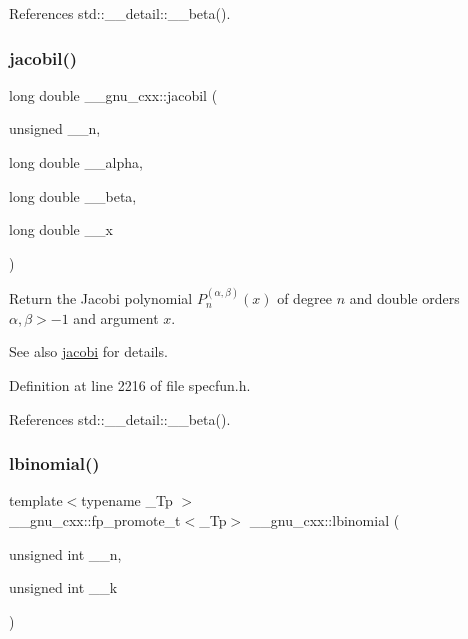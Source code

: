 References std\+::\+\_\+\+\_\+detail\+::\+\_\+\+\_\+beta().

\mbox{\label{group__gnu__math__spec__func_ga2898a5ebf451eaf259ecfcdd171aa72b}} 
\subsubsection{\texorpdfstring{jacobil()}{jacobil()}}
{\footnotesize\ttfamily long double \+\_\+\+\_\+gnu\+\_\+cxx\+::jacobil (\begin{DoxyParamCaption}\item[{unsigned}]{\+\_\+\+\_\+n,  }\item[{long double}]{\+\_\+\+\_\+alpha,  }\item[{long double}]{\+\_\+\+\_\+beta,  }\item[{long double}]{\+\_\+\+\_\+x }\end{DoxyParamCaption})\hspace{0.3cm}{\ttfamily [inline]}}

Return the Jacobi polynomial $ P_n^{(\alpha,\beta)}(x) $ of degree $ n $ and { double} orders $ \alpha, \beta > -1 $ and argument $ x $.

\begin{DoxySeeAlso}{See also}
\hyperlink{group__gnu__math__spec__func_gad54f6601748324d268532138eb38ca33}{jacobi} for details. 
\end{DoxySeeAlso}


Definition at line 2216 of file specfun.\+h.



References std\+::\+\_\+\+\_\+detail\+::\+\_\+\+\_\+beta().

\mbox{\label{group__gnu__math__spec__func_gabfa5aeba56edfa110846fc8e76963bc2}} 
\subsubsection{\texorpdfstring{lbinomial()}{lbinomial()}}
{\footnotesize\ttfamily template$<$typename \+\_\+\+Tp $>$ \\
\+\_\+\+\_\+gnu\+\_\+cxx\+::fp\+\_\+promote\+\_\+t$<$\+\_\+\+Tp$>$ \+\_\+\+\_\+gnu\+\_\+cxx\+::lbinomial (\begin{DoxyParamCaption}\item[{unsigned int}]{\+\_\+\+\_\+n,  }\item[{unsigned int}]{\+\_\+\+\_\+k }\end{DoxyParamCaption})\hspace{0.3cm}{\ttfamily [inline]}}



